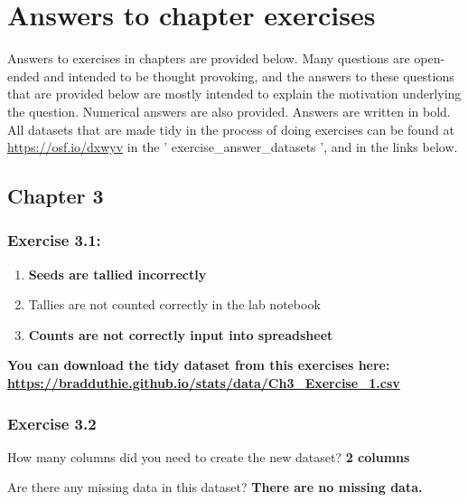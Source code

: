 \documentclass[
  openany]{scrbook}
\providecommand{\tightlist}{%
  \setlength{\itemsep}{0pt}\setlength{\parskip}{0pt}}
\begin{document}
\hypertarget{appendix-appendix}{%
\appendix}


\hypertarget{appendexA}{%
\chapter{Answers to chapter exercises}\label{appendexA}}

Answers to exercises in chapters are provided below.
Many questions are open-ended and intended to be thought provoking, and the answers to these questions that are provided below are mostly intended to explain the motivation underlying the question.
Numerical answers are also provided.
Answers are written in bold.
All datasets that are made tidy in the process of doing exercises can be found at \url{https://osf.io/dxwyv} in the ' exercise\_answer\_datasets ', and in the links below.

\hypertarget{chapter-3}{%
\section{Chapter 3}\label{chapter-3}}

\hypertarget{exercise-3.1}{%
\subsection{Exercise 3.1:}\label{exercise-3.1}}

\begin{enumerate}
\def\labelenumi{\arabic{enumi}.}
\tightlist
\item
  \textbf{Seeds are tallied incorrectly}
\item
  Tallies are not counted correctly in the lab notebook
\item
  \textbf{Counts are not correctly input into spreadsheet}
\end{enumerate}

\textbf{You can download the tidy dataset from this exercises here: \url{https://bradduthie.github.io/stats/data/Ch3_Exercise_1.csv}}

\hypertarget{exercise-3.2}{%
\subsection{Exercise 3.2}\label{exercise-3.2}}

How many columns did you need to create the new dataset? \textbf{2 columns}

Are there any missing data in this dataset? \textbf{There are no missing data.}
\end{document}
